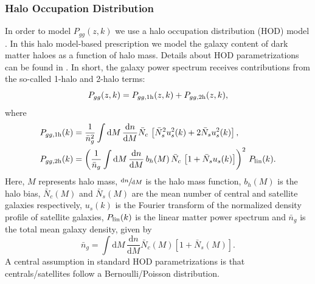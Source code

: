 \documentclass[a4paper,11pt]{article}
\begin{document}
  \subsubsection{Halo Occupation Distribution}\label{sssec:methods.theory.hod}
    In order to model $P_{gg}(z,k)$ we use a halo occupation distribution (HOD) model \citep{2000MNRAS.318.1144P,2002PhR...372....1C,2002ApJ...575..587B,2005ApJ...633..791Z,2013MNRAS.430..725V}. In this halo model-based prescription we model the galaxy content of dark matter haloes as a function of halo mass. Details about HOD parametrizations can be found in \cite{2011ApJ...736...59Z}. In short, the galaxy power spectrum receives contributions from the so-called 1-halo and 2-halo terms:
    \begin{equation}
      P_{gg}(z,k) = P_{gg,{\rm 1h}}(z,k) + P_{gg,{\rm 2h}}(z,k),
    \end{equation}
    where
    \begin{align}
      & P_{gg,{\rm 1h}}(k)=\frac{1}{\bar{n}_g^2} \int \mathrm{d}M\,\frac{\mathrm{d}n}{\mathrm{d}M} \bar{N}_c\,\left[\bar{N}_s^2u_s^2(k)+2\bar{N}_su_s^2(k)\right],\\
      & P_{gg,{\rm 2h}}(k)=\left(\frac{1}{\bar{n}_g} \int \mathrm{d}M\,\frac{\mathrm{d}n}{\mathrm{d}M}\,b_h(M)\,\bar{N}_c\,\left[1+\bar{N}_su_s(k)\right]\right)^2\,P_{\rm lin}(k).
    \end{align}
    Here, $M$ represents halo mass, $\sfrac{\mathrm{d}n}{\mathrm{d}M}$ is the halo mass function, $b_h(M)$ is the halo bias, $\bar{N}_c(M)$ and $\bar{N}_s(M)$ are the mean number of central and satellite galaxies respectively, $u_s(k)$ is the Fourier transform of the normalized density profile of satellite galaxies, $P_{\rm lin}(k)$ is the linear matter power spectrum and $\bar{n}_g$ is the total mean galaxy density, given by
    \begin{equation}
      \bar{n}_g=\int \mathrm{d}M\,\frac{\mathrm{d}n}{\mathrm{d}M}\bar{N}_c(M)\left[1+\bar{N}_s(M)\right].
      \label{eq:ng_hod}
    \end{equation}
    A central assumption in standard HOD parametrizations is that centrals/satellites follow a Bernoulli/Poisson distribution.
\end{document}
